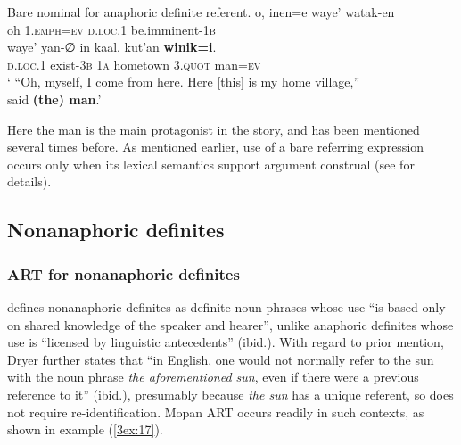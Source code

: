 \documentclass[output=paper]{langsci/langscibook}
\begin{document}
\begin{exe}
\ex\label{3ex:16}
Bare nominal for anaphoric definite referent.  
\exi{}
\gll	o,    	inen=e 			waye’           	watak-en \\
	oh     {\textsc{1.emph=ev}}	{\textsc{d.loc.1}}	be.imminent-{\textsc{1b}} \\
\glt
\exi{}
\gll	waye'           	yan-{∅}          	in     		kaal,			kut'an		{\textbf{winik=i}}. \\
	{\textsc{d.loc.1}}	exist-{\textsc{3b}}	{\textsc{1a}}	hometown		{\textsc{3.quot}}	man={\textsc{ev}} \\
\glt	` ``Oh, myself, I come from here. Here [this] is my home village,''\\said {\textbf{(the) man}}.'
\end{exe}

Here the man is the main protagonist in the story, and has been mentioned several times before.  As mentioned earlier, use of a bare referring expression occurs only when its lexical semantics support argument construal (see \citealt{contini:morava:danziger:fc} for details).


\subsection{Nonanaphoric definites}\label{3sec:32}

\subsubsection{ART for nonanaphoric definites}\label{3sec:321}

\cite[][e236]{dryer:14} defines nonanaphoric definites as definite noun phrases whose use ``is based only on shared knowledge of the speaker and hearer'', unlike anaphoric definites whose use is ``licensed by linguistic antecedents'' (ibid.).  With regard to prior mention, Dryer further states that ``in English, one would not normally refer to the sun with the noun phrase {\emph{the aforementioned sun}}, even if there were a previous reference to it'' (ibid.), presumably because {\emph{the sun}} has a unique referent, so does not require re-identification.  Mopan ART occurs readily in such contexts, as shown in example (\ref{3ex:17}).
\end{document}
